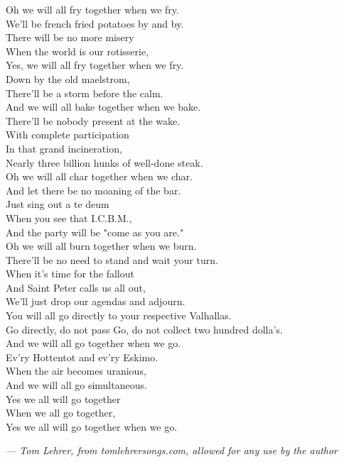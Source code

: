 \begin{commentary}
\begin{multicols}{2}
Oh we will all fry together when we fry.\\
We'll be french fried potatoes by and by.\\
There will be no more misery\\
When the world is our rotisserie,\\
Yes, we will all fry together when we fry.\\[0.5em]
Down by the old maelstrom,\\
There'll be a storm before the calm.\\[0.5em]
And we will all bake together when we bake.\\
There'll be nobody present at the wake.\\
With complete participation\\
In that grand incineration,\\
Nearly three billion hunks of well-done steak.\\[0.5em]
Oh we will all char together when we char.\\
And let there be no moaning of the bar.\\
Just sing out a te deum\\
When you see that I.C.B.M.,\\
And the party will be "come as you are."\\[0.5em]
Oh we will all burn together when we burn.\\
There'll be no need to stand and wait your turn.\\
When it's time for the fallout\\
And Saint Peter calls us all out,\\
We'll just drop our agendas and adjourn.\\[0.5em]
You will all go directly to your respective Valhallas.\\
Go directly, do not pass Go, do not collect two hundred dolla's.\\[0.5em]
And we will all go together when we go.\\
Ev'ry Hottentot and ev'ry Eskimo.\\
When the air becomes uranious,\\
And we will all go simultaneous.\\
Yes we all will go together\\
When we all go together,\\
Yes we all will go together when we go.
\end{multicols}

\normalsize\hfill\textit{— Tom Lehrer, from tomlehrersongs.com, allowed for any use by the author}
\end{commentary}
